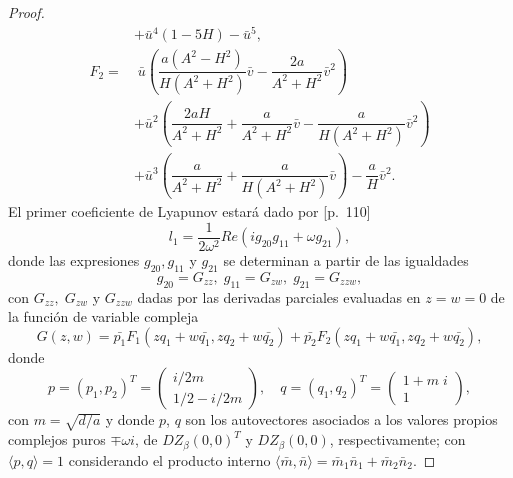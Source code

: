\documentclass[]{article}
\theoremstyle{remark}
\begin{document}
\begin{proof}
\begin{equation}
\begin{aligned}
				& + \bar{u}^4(1 - 5H) - \bar{u}^5, \\
				F_2 = & \; \bar{u} \left(\dfrac{a(A^2 - H^2)}{H(A^2 + H^2)} \bar{v} - \dfrac{2a}{A^2 + H^2} \bar{v}^2 \right) \\
				& + \bar{u}^2\left(\dfrac{2aH}{A^2 + H^2} + \dfrac{a}{A^2 + H^2} \bar{v} - \dfrac{a}{H(A^2 + H^2)} \bar{v}^2 \right) \\
				& + \bar{u}^3\left( \dfrac{a}{A^2 + H^2} + \dfrac{a}{H(A^2 + H^2)} \bar{v} \right) - \dfrac{a}{H} \bar{v}^2.
			\end{aligned}
			\label{eq: expansionF1,2}
		\end{equation}
		El primer coeficiente de Lyapunov estará dado por \cite{kuznetsov}[p.~110]
		\begin{equation}
			l_1 = \dfrac{1}{2 \omega^2}Re(i g_{20}g_{11} + \omega g_{21}),
			\label{eq: l1}
		\end{equation}
		donde las expresiones $ g_{20}, g_{11}$ y $g_{21}$ se determinan a partir de las igualdades
		\begin{equation*}
			g_{20}=G_{zz}, \; g_{11}=G_{zw}, \; g_{21}=G_{zzw},
		\end{equation*}
		con $G_{z z}, \;G_{z w}$ y $G_{z z w}$ dadas por las derivadas parciales evaluadas en $z=w=0$ de la función de variable compleja
		\begin{equation}
			G(z,w) = \bar{p_1}F_1(zq_1+w\bar{q_1}, zq_2+w\bar{q_2}) + \bar{p_2}F_2(zq_1+w\bar{q_1}, zq_2+w\bar{q_2}),
			\label{eq: funComplejaL1}
		\end{equation}
		donde
		\begin{equation}
			p = (p_1,p_2)^T =
			\begin{pmatrix}
				i/2m\\
				1/2 - i/2m
			\end{pmatrix}, \quad
			q = (q_1,q_2)^T =
			\begin{pmatrix}
				1+m \; i\\
				1
			\end{pmatrix},
			\label{eq: vecComplejos}
		\end{equation}
		con $m = \sqrt{d/a}$ y donde $p$, $q$ son los autovectores asociados a los valores propios complejos puros $\mp \omega i$, de $DZ_\beta(0,0)^T$ y $DZ_\beta(0,0)$, respectivamente; con $\langle p,q \rangle = 1$ considerando el producto interno $\langle \bar{m},\bar{n} \rangle = \bar{m}_1 \bar{n}_1 + \bar{m}_2 \bar{n}_2$.
		

\end{proof}
\end{document}
